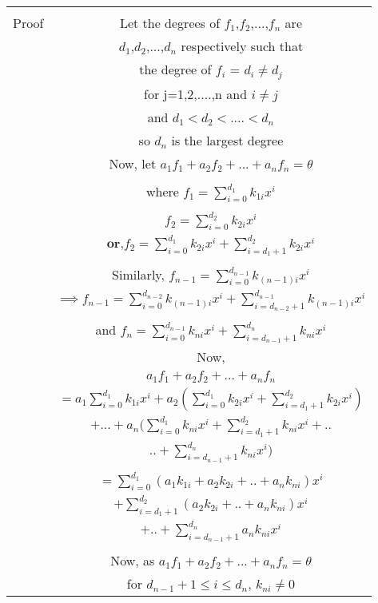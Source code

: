 \documentclass[journal,12pt,twocolumn]{IEEEtran}
\begin{document}
\begin{table}[h!]
\begin{center}
\begin{tabular}{|c|c|}
\hline
& \\
Proof & Let the degrees of $f_1$,$f_2$,...,$f_n$ are\\
& $d_1$,$d_2$,...,$d_n$ respectively such that\\
& the degree of $f_i$ = $d_i \neq d_j$\\
& for j=1,2,....,n and $i \neq j$\\
& and $d_1 < d_2 < ....< d_n$\\
& so $d_n$ is the largest degree\\
\hline
& Now, let $a_1f_1+a_2f_2+...+a_nf_n=\theta$\\
& \\
& where $f_1 = \sum_{i=0}^{d_1}k_{1i}x^i$\\
& \\
& $f_2 = \sum_{i=0}^{d_2}k_{2i}x^i$\\
& $\textbf{or,}f_2 = \sum_{i=0}^{d_1}k_{2i}x^i+ \sum_{i=d_1+1}^{d_2}k_{2i}x^i$\\
& \\
& Similarly, $f_{n-1}=\sum_{i=0}^{d_{n-1}}k_{(n-1)i}x^i$\\
& $\implies f_{n-1}= \sum_{i=0}^{d_{n-2}}k_{(n-1)i}x^i+ \sum_{i=d_{n-2}+1}^{d_{n-1}}k_{(n-1)i}x^i$\\
& \\
& and $f_n = \sum_{i=0}^{d_{n-1}}k_{ni}x^i+ \sum_{i=d_{n-1}+1}^{d_{n}}k_{ni}x^i$\\
\hline
& Now,\\
& $a_1f_1+a_2f_2+...+a_nf_n$\\
& $=a_1\sum_{i=0}^{d_1}k_{1i}x^i + a_2(\sum_{i=0}^{d_1}k_{2i}x^i+ \sum_{i=d_1+1}^{d_2}k_{2i}x^i)$\\
& $+ ...+a_n(\sum_{i=0}^{d_1}k_{ni}x^i+ \sum_{i=d_1+1}^{d_2}k_{ni}x^i+..$\\
& $..+\sum_{i=d_{n-1}+1}^{d_{n}}k_{ni}x^i)$\\
& \\
& $=\sum_{i=0}^{d_1}(a_1k_{1i}+a_2k_{2i}+..+a_nk_{ni})x^i$\\
& $+\sum_{i=d_1+1}^{d_2}(a_2k_{2i}+..+a_nk_{ni})x^i$\\
& $+..+\sum_{i=d_{n-1}+1}^{d_{n}}a_nk_{ni}x^i$\\
& \\
& Now, as $a_1f_1+a_2f_2+...+a_nf_n=\theta$ \\
& for $d_{n-1}+1\leq i \leq d_n$, $k_{ni}\neq 0$\\

\end{tabular}
\end{center}
\end{table}
\end{document}
